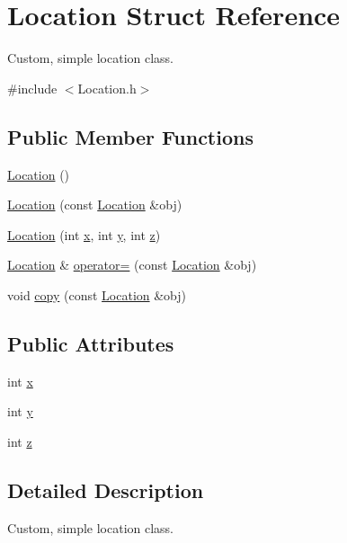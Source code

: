 \hypertarget{structLocation}{\section{Location Struct Reference}
\label{structLocation}
}


Custom, simple location class.  




{\ttfamily \#include $<$Location.\-h$>$}

\subsection*{Public Member Functions}
\begin{DoxyCompactItemize}
\item 
\hyperlink{structLocation_a87790c14997fd8cdd12080c78c9794bb}{Location} ()
\item 
\hyperlink{structLocation_a02b70305fcef2e7913e5282bbafe7833}{Location} (const \hyperlink{structLocation}{Location} \&obj)
\item 
\hyperlink{structLocation_ada7ef731cfa1f39a6512b3e6eecf434d}{Location} (int \hyperlink{structLocation_aea76eebc474e30c04c53e5f03c6749e3}{x}, int \hyperlink{structLocation_a307809776b981810147af56d9304e273}{y}, int \hyperlink{structLocation_ad46e606795ee67a3775a53da49b37284}{z})
\item 
\hyperlink{structLocation}{Location} \& \hyperlink{structLocation_a4872cfb218bcb4c430a020f9e152866a}{operator=} (const \hyperlink{structLocation}{Location} \&obj)
\item 
void \hyperlink{structLocation_a4779c67a789befcb983db6d815ae9812}{copy} (const \hyperlink{structLocation}{Location} \&obj)
\end{DoxyCompactItemize}
\subsection*{Public Attributes}
\begin{DoxyCompactItemize}
\item 
int \hyperlink{structLocation_aea76eebc474e30c04c53e5f03c6749e3}{x}
\item 
int \hyperlink{structLocation_a307809776b981810147af56d9304e273}{y}
\item 
int \hyperlink{structLocation_ad46e606795ee67a3775a53da49b37284}{z}
\end{DoxyCompactItemize}


\subsection{Detailed Description}
Custom, simple location class. 

